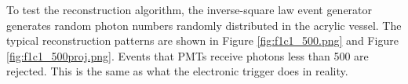 %
%
%
%
%
%


To test the reconstruction algorithm,
the inverse-square law event generator generates random photon numbers randomly distributed in the acrylic vessel.
The typical reconstruction patterns are shown in Figure \ref{fig:f1c1_500.png} and Figure \ref{fig:f1c1_500proj.png}.
Events that PMTs receive photons less than 500 are rejected. This is the same as what the electronic trigger does in reality.








